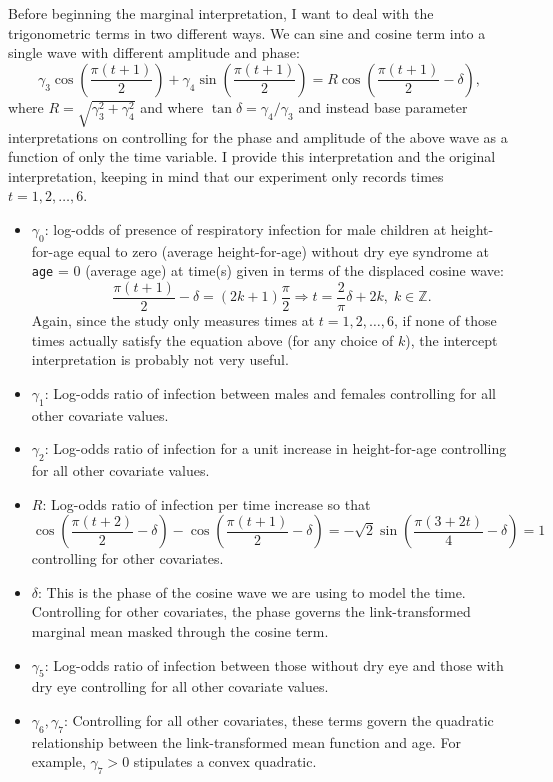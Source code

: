 \documentclass[11pt]{article}
\newcommand{\Z}{\mathbb{Z}}
\begin{document}
\begin{enumerate}
\begin{enumerate}
			Before beginning the marginal interpretation, I want to deal with the trigonometric terms in two different ways. We can sine and cosine term into a single wave with different amplitude and phase:
			\[
				\gamma_3\cos\left(\frac{\pi(t+1)}{2}\right)+\gamma_4\sin\left(\frac{\pi(t+1)}{2}\right) = R\cos\left(\frac{\pi(t+1)}{2} - \delta \right),
			\]
			where $R = \sqrt{\gamma_3^2+\gamma_4^2}$ and where $\tan\delta = \gamma_4/\gamma_3$ and instead base parameter interpretations on controlling for the phase and amplitude of the above wave as a function of only the time variable. I provide this interpretation and the original interpretation, keeping in mind that our experiment only records times $t=1,2,\dotsc,6$.
			\begin{itemize}
				\item $\gamma_0$: log-odds of presence of respiratory infection for male children at height-for-age equal to zero (average height-for-age) without dry eye syndrome at \texttt{age} = 0 (average age) at time(s) given in terms of the displaced cosine wave:
				\[
					\frac{\pi(t+1)}{2} - \delta = (2k+1)\frac{\pi}{2}\Longrightarrow t = \frac{2}{\pi}\delta + 2k,\; k\in \Z.
				\]
				 Again, since the study only measures times at $t=1,2,\dotsc,6$, if none of those times actually satisfy the equation above (for any choice of $k$), the intercept interpretation is probably not very useful.
				\item $\gamma_1$: Log-odds ratio of infection between males and females controlling for all other covariate values.
				\item $\gamma_2$: Log-odds ratio of infection for a unit increase in height-for-age controlling for all other covariate values.
				\item $R$: Log-odds ratio of infection per time increase so that
				\[
					\cos\left(\frac{\pi(t+2)}{2} - \delta \right) - \cos\left(\frac{\pi(t+1)}{2} - \delta \right)= -\sqrt{2}\sin\left(\frac{\pi(3 + 2 t)}{4} -  \delta\right) = 1
				\]
				controlling for other covariates.
				\item $\delta$: This is the phase of the cosine wave we are using to model the time. Controlling for other covariates, the phase governs the link-transformed marginal mean masked through the cosine term.
				\item $\gamma_5$: Log-odds ratio of infection between those without dry eye and those with dry eye controlling for all other covariate values.
				\item $\gamma_6,\gamma_7$: Controlling for all other covariates, these terms govern the quadratic relationship between the link-transformed mean function and age. For example, $\gamma_7>0$ stipulates a convex quadratic.

\end{itemize}
\end{enumerate}
\end{enumerate}
\end{document}
